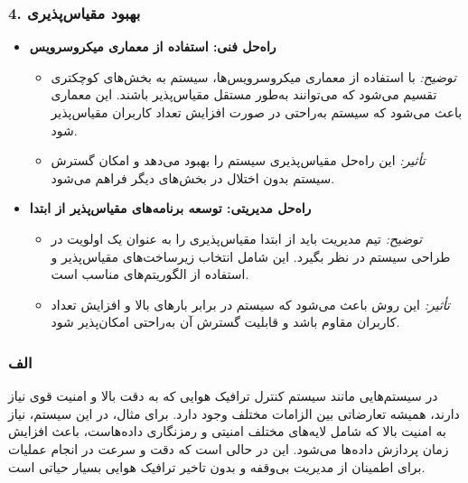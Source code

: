 \subsubsection*{4. بهبود مقیاس‌پذیری}

\begin{itemize}
    \item \textbf{راه‌حل فنی: استفاده از معماری میکروسرویس}
    \begin{itemize}
        \item \textit{توضیح:} با استفاده از معماری میکروسرویس‌ها، سیستم به بخش‌های کوچکتری تقسیم می‌شود که می‌توانند به‌طور مستقل مقیاس‌پذیر باشند. این معماری باعث می‌شود که سیستم به‌راحتی در صورت افزایش تعداد کاربران مقیاس‌پذیر شود.
        \item \textit{تأثیر:} این راه‌حل مقیاس‌پذیری سیستم را بهبود می‌دهد و امکان گسترش سیستم بدون اختلال در بخش‌های دیگر فراهم می‌شود.
    \end{itemize}
    
    \item \textbf{راه‌حل مدیریتی: توسعه برنامه‌های مقیاس‌پذیر از ابتدا}
    \begin{itemize}
        \item \textit{توضیح:} تیم مدیریت باید از ابتدا مقیاس‌پذیری را به عنوان یک اولویت در طراحی سیستم در نظر بگیرد. این شامل انتخاب زیرساخت‌های مقیاس‌پذیر و استفاده از الگوریتم‌های مناسب است.
        \item \textit{تأثیر:} این روش باعث می‌شود که سیستم در برابر بارهای بالا و افزایش تعداد کاربران مقاوم باشد و قابلیت گسترش آن به‌راحتی امکان‌پذیر شود.
    \end{itemize}
\end{itemize}




\subsubsection*{الف}


در سیستم‌هایی مانند سیستم کنترل ترافیک هوایی که به دقت بالا و امنیت قوی نیاز دارند، همیشه تعارضاتی بین الزامات مختلف وجود دارد. برای مثال، در این سیستم، نیاز به امنیت بالا که شامل لایه‌های مختلف امنیتی و رمزنگاری داده‌هاست، باعث افزایش زمان پردازش داده‌ها می‌شود. این در حالی است که دقت و سرعت در انجام عملیات برای اطمینان از مدیریت بی‌وقفه و بدون تاخیر ترافیک هوایی بسیار حیاتی است. 

